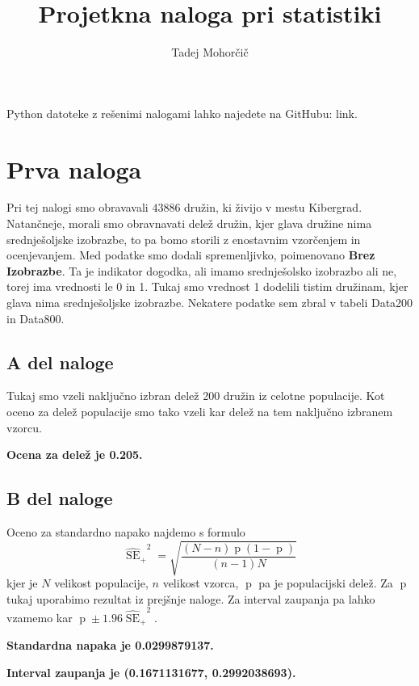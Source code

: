 \documentclass{article}
\title{Projetkna naloga pri statistiki}
\author{Tadej Mohorčič}
\date{}
\DeclareMathOperator{\se}{SE}
\DeclareMathOperator{\de}{p}
\begin{document}
    
    \maketitle

    Python datoteke z rešenimi nalogami lahko najedete na GitHubu: link.


    \section{Prva naloga}
    Pri tej nalogi smo obravavali $43886$ družin, ki živijo v mestu Kibergrad. Natančneje, morali smo obravnavati delež družin, kjer glava družine nima srednješoljske izobrazbe,
    to pa bomo storili z enostavnim vzorčenjem in ocenjevanjem. Med podatke smo dodali spremenljivko, poimenovano \textbf{Brez Izobrazbe}. Ta je indikator dogodka, ali imamo
    srednješolsko izobrazbo ali ne, torej ima vrednosti le 0 in 1. Tukaj smo vrednost 1 dodelili tistim družinam, kjer glava nima srednješoljske izobrazbe. Nekatere podatke sem
    zbral v tabeli Data200 in Data800.

    \subsection{A del naloge}
    Tukaj smo vzeli naključno izbran delež 200 družin iz celotne populacije. Kot oceno za delež populacije smo tako vzeli kar delež na tem naključno izbranem vzorcu.
    \par \textbf{Ocena za delež je 0.205.}

    \subsection{B del naloge}
    Oceno za standardno napako najdemo s formulo
    \[
        {\widehat{\se}_{+}}^2 = \sqrt{\frac{(N - n)\de(1 - \de)}{(n - 1)N}}
    \]
    kjer je $N$ velikost populacije, $n$ velikost vzorca, $\de$ pa je populacijski delež. Za $\de$ tukaj uporabimo rezultat iz prejšnje naloge. Za interval zaupanja pa lahko
    vzamemo kar $\de \pm 1.96{\widehat{\se}_{+}}^2$.
    \par \textbf{Standardna napaka je 0.0299879137.}
    \par \textbf{Interval zaupanja je (0.1671131677, 0.2992038693).}
\end{document}
